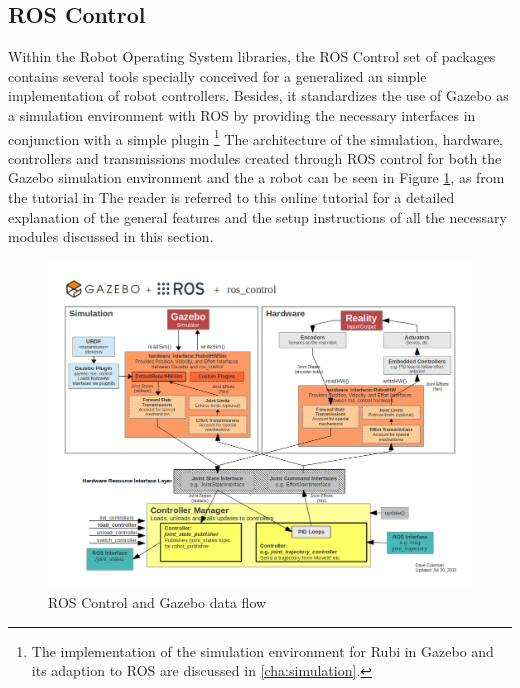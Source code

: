 
\subsection{ROS Control} %
\label{sub:ros_control}
Within the Robot Operating System libraries, the ROS Control set of packages \cite{ros_control} contains several tools specially conceived for a generalized an simple implementation of robot controllers.
Besides, it standardizes the use of Gazebo \cite{gazebo} as a simulation environment with ROS by providing the necessary interfaces in conjunction with a simple plugin \footnote{The implementation of the simulation environment for Rubi in Gazebo and its adaption to ROS are discussed in \ref{cha:simulation}.}
The architecture of the simulation, hardware, controllers and transmissions modules created through ROS control for both the Gazebo simulation environment and the a robot can be seen in Figure \ref{fig:ros_control_gazebo}, as from the tutorial in \cite{ros_control_tutorial} The reader is referred to this online tutorial for a detailed explanation of the general features and the setup instructions of all the necessary modules discussed in this section.

\begin{figure}[h]
	\centering
	\includegraphics[width=\textwidth]{figures/ros_control_gazebo.png} 
	\caption{ROS Control and Gazebo data flow}
	\label{fig:ros_control_gazebo}
\end{figure}

